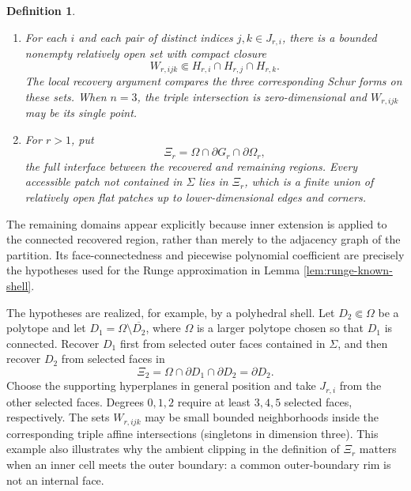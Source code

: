 \documentclass[10pt,a4paper]{amsart}
\newtheorem{definition}[theorem]{Definition}
\begin{document}
\begin{definition}
\begin{enumerate}[label=(\roman*)]
  \(H_{r,1},\ldots,H_{r,M_r}\) of the accessible patches are
  \(N_{\alpha_r}\)-generic.  We fix sets \(J_{r,i}\), \(|J_{r,i}|=N_{\alpha_r}+2\),
  witnessing Definition \ref{def:N-generic}.
  \item For each \(i\) and each pair of distinct indices \(j,k\in J_{r,i}\), there
  is a bounded nonempty relatively open set with compact closure
  \begin{equation}
    W_{r,ijk}\Subset H_{r,i}\cap H_{r,j}\cap H_{r,k}.
  \end{equation}
  The local recovery argument compares the three corresponding Schur forms on
  these sets.  When \(n=3\), the triple intersection is zero-dimensional and
  \(W_{r,ijk}\) may be its single point.
  \item For \(r>1\), put
  \begin{equation}
    \Xi_r=\Omega\cap\partial G_r\cap\partial\Omega_r,
  \end{equation}
  the full interface between the recovered and remaining regions.  Every
  accessible patch not contained in \(\Sigma\) lies in \(\Xi_r\), which is a
  finite union of relatively open flat patches up to lower-dimensional edges
  and corners.
\end{enumerate}
\end{definition}

The remaining domains appear explicitly because inner extension is applied to
the connected recovered region, rather than merely to the adjacency graph of
the partition.  Its face-connectedness and piecewise polynomial coefficient
are precisely the hypotheses used for the Runge approximation in Lemma
\ref{lem:runge-known-shell}.

The hypotheses are realized, for example, by a polyhedral shell.  Let
\(D_2\Subset\Omega\) be a polytope and let
\(D_1=\Omega\setminus\overline{D_2}\), where \(\Omega\) is a larger polytope
chosen so that \(D_1\) is connected.  Recover \(D_1\) first from selected outer
faces contained in \(\Sigma\), and then recover \(D_2\) from selected faces in
\begin{equation}
  \Xi_2=\Omega\cap\partial D_1\cap\partial D_2=\partial D_2.
\end{equation}
Choose the supporting hyperplanes in general position and take
\(J_{r,i}\) from the other selected faces.  Degrees \(0,1,2\) require at least
\(3,4,5\) selected faces, respectively.  The sets \(W_{r,ijk}\) may be small
bounded neighborhoods inside the corresponding triple affine intersections
(singletons in dimension three).  This example also illustrates why the
ambient clipping in the definition of \(\Xi_r\) matters when an inner cell
meets the outer boundary: a common outer-boundary rim is not an internal face.
\end{document}

